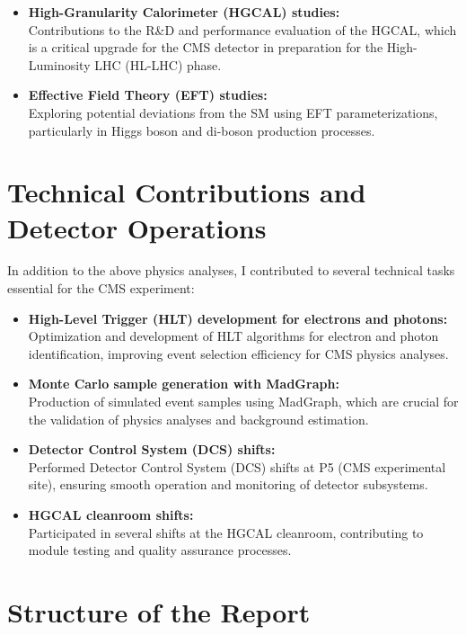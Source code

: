 \begin{itemize}
    \item \textbf{High-Granularity Calorimeter (HGCAL) studies:} \\
    Contributions to the R\&D and performance evaluation of the HGCAL,
    which is a critical upgrade for the CMS detector in preparation for the High-Luminosity LHC (HL-LHC) phase.

    \item \textbf{Effective Field Theory (EFT) studies:} \\
    Exploring potential deviations from the SM using EFT parameterizations,
    particularly in Higgs boson and di-boson production processes.
\end{itemize}

\section*{Technical Contributions and Detector Operations}

In addition to the above physics analyses, I contributed to several technical tasks essential for the CMS experiment:
\begin{itemize}
    \item \textbf{High-Level Trigger (HLT) development for electrons and photons:} \\
    Optimization and development of HLT algorithms for electron and photon identification,
    improving event selection efficiency for CMS physics analyses.

    \item \textbf{Monte Carlo sample generation with MadGraph:} \\
    Production of simulated event samples using MadGraph, which are crucial for the validation of physics
    analyses and background estimation.

    \item \textbf{Detector Control System (DCS) shifts:} \\
    Performed Detector Control System (DCS) shifts at P5 (CMS experimental site),
    ensuring smooth operation and monitoring of detector subsystems.

    \item \textbf{HGCAL cleanroom shifts:} \\
    Participated in several shifts at the HGCAL cleanroom, contributing to module testing and
    quality assurance processes.
\end{itemize}

\section*{Structure of the Report}


